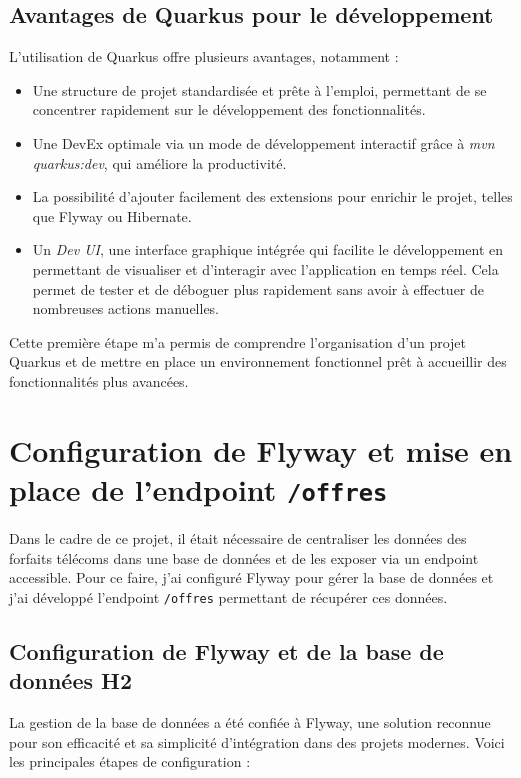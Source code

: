 \documentclass[11pt]{article}
\begin{document}
		\subsection{Avantages de Quarkus pour le développement}
		
		L’utilisation de Quarkus offre plusieurs avantages, notamment :
		\begin{itemize}
			\item Une structure de projet standardisée et prête à l’emploi, permettant de se concentrer rapidement sur le développement des fonctionnalités.
			\item Une DevEx optimale via un mode de développement interactif grâce à \textit{mvn quarkus:dev}, qui améliore la productivité.
			\item La possibilité d’ajouter facilement des extensions pour enrichir le projet, telles que Flyway ou Hibernate.
			\item Un \textit{Dev UI}, une interface graphique intégrée qui facilite le développement en permettant de visualiser et d'interagir avec l'application en temps réel. Cela permet de tester et de déboguer plus rapidement sans avoir à effectuer de nombreuses actions manuelles.
		\end{itemize}
		
		Cette première étape m’a permis de comprendre l’organisation d’un projet Quarkus et de mettre en place un environnement fonctionnel prêt à accueillir des fonctionnalités plus avancées.
		
		\section{Configuration de Flyway et mise en place de l'endpoint \texttt{/offres}}
		
		Dans le cadre de ce projet, il était nécessaire de centraliser les données des forfaits télécoms dans une base de données et de les exposer via un endpoint accessible. Pour ce faire, j'ai configuré Flyway pour gérer la base de données et j'ai développé l'endpoint \texttt{/offres} permettant de récupérer ces données.
		
		\subsection{Configuration de Flyway et de la base de données H2}
		
		La gestion de la base de données a été confiée à Flyway, une solution reconnue pour son efficacité et sa simplicité d'intégration dans des projets modernes. Voici les principales étapes de configuration :
		
\end{document}
